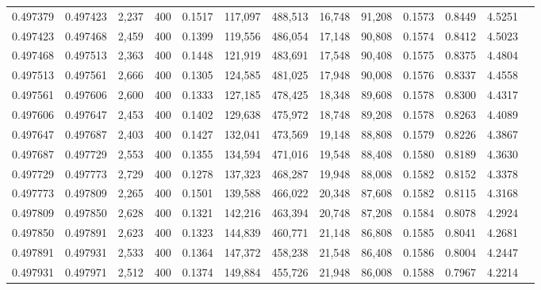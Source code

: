 \begin{tabular}{rrrrrrrrrrrrr}
0.497379 & 0.497423 & 2,237 & 400 &                                     0.1517 & 117,097 & 488,513 &  16,748 &  91,208 & 0.1573 & 0.8449 & 4.5251 \\
0.497423 & 0.497468 & 2,459 & 400 &                                     0.1399 & 119,556 & 486,054 &  17,148 &  90,808 & 0.1574 & 0.8412 & 4.5023 \\
0.497468 & 0.497513 & 2,363 & 400 &                                     0.1448 & 121,919 & 483,691 &  17,548 &  90,408 & 0.1575 & 0.8375 & 4.4804 \\
0.497513 & 0.497561 & 2,666 & 400 &                                     0.1305 & 124,585 & 481,025 &  17,948 &  90,008 & 0.1576 & 0.8337 & 4.4558 \\
0.497561 & 0.497606 & 2,600 & 400 &                                     0.1333 & 127,185 & 478,425 &  18,348 &  89,608 & 0.1578 & 0.8300 & 4.4317 \\
0.497606 & 0.497647 & 2,453 & 400 &                                     0.1402 & 129,638 & 475,972 &  18,748 &  89,208 & 0.1578 & 0.8263 & 4.4089 \\
0.497647 & 0.497687 & 2,403 & 400 &                                     0.1427 & 132,041 & 473,569 &  19,148 &  88,808 & 0.1579 & 0.8226 & 4.3867 \\
0.497687 & 0.497729 & 2,553 & 400 &                                     0.1355 & 134,594 & 471,016 &  19,548 &  88,408 & 0.1580 & 0.8189 & 4.3630 \\
0.497729 & 0.497773 & 2,729 & 400 &                                     0.1278 & 137,323 & 468,287 &  19,948 &  88,008 & 0.1582 & 0.8152 & 4.3378 \\
0.497773 & 0.497809 & 2,265 & 400 &                                     0.1501 & 139,588 & 466,022 &  20,348 &  87,608 & 0.1582 & 0.8115 & 4.3168 \\
0.497809 & 0.497850 & 2,628 & 400 &                                     0.1321 & 142,216 & 463,394 &  20,748 &  87,208 & 0.1584 & 0.8078 & 4.2924 \\
0.497850 & 0.497891 & 2,623 & 400 &                                     0.1323 & 144,839 & 460,771 &  21,148 &  86,808 & 0.1585 & 0.8041 & 4.2681 \\
0.497891 & 0.497931 & 2,533 & 400 &                                     0.1364 & 147,372 & 458,238 &  21,548 &  86,408 & 0.1586 & 0.8004 & 4.2447 \\
0.497931 & 0.497971 & 2,512 & 400 &                                     0.1374 & 149,884 & 455,726 &  21,948 &  86,008 & 0.1588 & 0.7967 & 4.2214 \\

\end{tabular}
